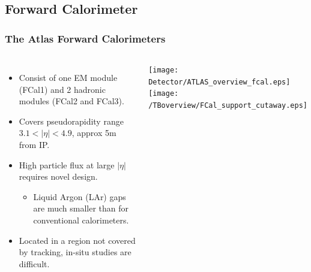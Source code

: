 \documentclass[10pt]{beamer}
\begin{document}
\subsection{Forward Calorimeter}
\begin{frame}\frametitle{The Atlas Forward Calorimeters} 
\begin{columns}
\begin{itemize}
\item Consist of one EM module (FCal1) and 2 hadronic modules (FCal2 and FCal3).
\item Covers pseudorapidity range $3.1 < |\eta| < 4.9$, approx 5m from IP.
\item High particle flux at large $|\eta|$ requires novel design.
\begin{itemize}
\item Liquid Argon (LAr) gaps are much smaller than for conventional calorimeters.
\end{itemize}
\item Located in a region not covered by tracking, in-situ studies are difficult.
\end{itemize}
\texttt{[image: Detector/ATLAS\_overview\_fcal.eps]}\\
\texttt{[image: /TBoverview/FCal\_support\_cutaway.eps]}
\end{columns}
\end{frame}
\end{document}
